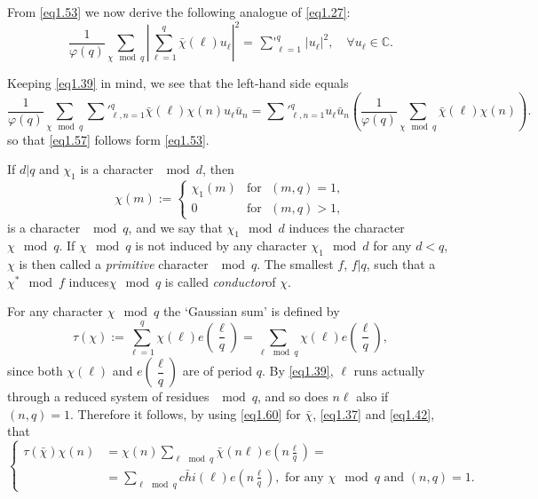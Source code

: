 From \eqref{eq1.53} we now derive the following analogue of \eqref{eq1.27}:
\begin{equation*}%
\frac{1}{\varphi(q)} \sum_{\chi \mod q}| \sum^q_{\ell
  =1}\bar{\chi}(\ell)u_\ell |^2 = \mathop{\sum{}'}^q_{\ell
  =1}|u_{\ell}|^{2},\quad \forall u_\ell \in
\mathbb{C}. \tag{1.57}\label{eq1.57}  
\end{equation*}

Keeping \eqref{eq1.39} in mind, we see that the left-hand side equals
\begin{equation*}%
\frac{1}{\varphi(q)} \sum_{\chi \mod q} \sum'^q_{\ell, n
  =1}\bar{\chi}(\ell)\chi(n)u_\ell \bar{u}_n = \sum'^q_{\ell, n
  =1}u_\ell \bar{u}_n (\frac{1}{\varphi(q)} \sum_{\chi \mod q}
\bar{\chi}(\ell)\chi(n)). \tag{1.58}\label{eq1.58} 
\end{equation*}
so that \eqref{eq1.57} follows form \eqref{eq1.53}. 

If $d|q$ and $\chi_1$ is a character $\mod d$, then 
\begin{equation*}%
\chi(m):= 
\begin{cases}
\chi_1(m) & \text{for~ }(m, q)=1, \\
0 & \text{for~ } (m, q) >1, 
\end{cases} \tag{1.59}\label{eq1.59}
\end{equation*}
is a character $\mod q$, and we say that $\chi_1 \mod d$ induces the
character $\chi \mod q$. If $\chi \mod q$ is not induced by any character
$\chi_1 \mod d$  for any $d <q$, $\chi$ is then called a \textit{primitive}
character $\mod q$. The smallest $f$, $f|q$, such that a $\chi^*
\mod f$ induces\pageoriginale $\chi \mod q$ is called
\textit{conductor}of $\chi$.   

For any character $\chi \mod q $ the `Gaussian sum' is defined by 
\begin{equation*}%
\tau(\chi):=\sum^q_{\ell=1}\chi(\ell) e(\frac{\ell}{q})= \sum_{\ell
  \mod q} \chi(\ell) e(\frac{\ell}{q}),  \tag{1.60}\label{eq1.60} 
\end{equation*}
since both $\chi(\ell)$ and $e(\dfrac{\ell}{q})$ are of period $q$. By
\eqref{eq1.39}, $\ell$ runs actually through a reduced system of residues
$\mod q$, and so does $n \ell$ also if $(n,q)=1$. Therefore it
follows, by using \eqref{eq1.60} for $\bar{\chi}$, \eqref{eq1.37} and
\eqref{eq1.42}, that   
\begin{equation*}%
\begin{cases}
\tau(\bar{\chi}) \chi(n) & =\chi(n) \sum\limits_{\ell \mod q}
\bar{\chi}(n\ell) e(n\frac{\ell}{q})=\\ 
& = \sum\limits_{\ell \mod q}\bar{chi}(\ell)
e(n\frac{\ell}{q}), \text{ for any } \chi \mod q \text{ and } (n,q)=1. 
\end{cases}\tag{1.61}\label{eq1.61}
\end{equation*}

